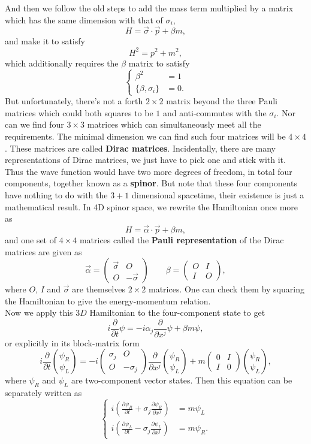 \documentclass{article}
\newcommand{\be}{\begin{equation}}
\newcommand{\ee}{\end{equation}}
\newcommand{\ba}{\begin{array}}
\newcommand{\ea}{\end{array}}
\newcommand{\p}{\partial}
\renewcommand{\1}{\left}
\renewcommand{\2}{\right}
\newcommand{\al}{\alpha}
\newcommand{\bet}{\beta}
\newcommand{\sig}{\sigma}
\begin{document}
And then we follow the old steps to add the mass term multiplied by a matrix which has the same dimension with that of $\sig_i$,
\be H=\vec\sig\cdot\vec p+\bet m, \ee
and make it to satisfy
\be H^2=p^2+m^2, \ee
which additionally requires the $\bet$ matrix to satisfy
\be\1\{\begin{split}
\bet^2&=1\\
\{\bet,\sig_i\}&=0.
\end{split}\2.\ee
But unfortunately, there's not a forth $2\times 2$ matrix beyond the three Pauli matrices which could both squares to be $1$ and anti-commutes with the $\sig_i$. Nor can we find four $3\times 3$ matrices which can simultaneously meet all the requirements. The minimal dimension we can find such four matrices will be $4\times 4$. These matrices are called \textbf{Dirac matrices}. Incidentally, there are many representations of Dirac matrices, we just have to pick one and stick with it. Thus the wave function would have two more degrees of freedom, in total four components, together known as a \textbf{spinor}. But note that these four components have nothing to do with the $3+1$ dimensional spacetime, their existence is just a mathematical result. In 4D spinor space, we rewrite the Hamiltonian once more as 
\be H=\vec\al\cdot\vec p+\bet m, \ee
and one set of $4\times 4$ matrices called the \textbf{Pauli representation} of the Dirac matrices are given as
\be 
\vec\al=\1(\ba{cc}\vec\sig&O\\O&-\vec\sig\ea\2) \quad\quad \bet=\1(\ba{cc}O&I\\I&O\ea\2),
\ee
where $O$, $I$ and $\vec\sig$ are themselves $2\times 2$ matrices. One can check them by squaring the Hamiltonian to give the energy-momentum relation.\\
Now we apply this $3D$ Hamiltonian to the four-component state to get
\be
i\frac{\p}{\p t}\psi=-i\al_j\frac{\p}{\p x^j}\psi+\bet m\psi,
\ee
or explicitly in its block-matrix form
\be
i\frac{\p}{\p t}\binom{\psi_R}{\psi_L}=-i\1(\ba{cc}\sig_j&O\\O&-\sig_j\ea\2)\frac{\p}{\p x^j}\binom{\psi_R}{\psi_L}+ m\1(\ba{cc}0&I\\I&0\ea\2)\binom{\psi_R}{\psi_L},
\ee
where $\psi_R$ and $\psi_L$ are two-component vector states. Then this equation can be separately written as 
\be\1\{\begin{split}
i\1(\frac{\p\psi_R}{\p t}+\sig_j\frac{\p\psi_R}{\p x^j}\2)&=m\psi_L\\
i\1(\frac{\p\psi_L}{\p t}-\sig_j\frac{\p\psi_L}{\p x^j}\2)&=m\psi_R.
\end{split}\2.\ee
\end{document}
